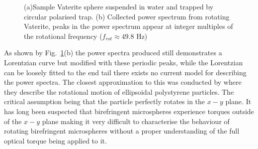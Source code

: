 \begin{figure}[h!]
\begin{subfigure}{0.55\linewidth}
		\subcaption{}
	\end{subfigure}
	\caption{(a)Sample Vaterite sphere suspended in water and trapped by circular polarised trap. (b) Collected power spectrum from rotating Vaterite, peaks in the power spectrum appear at integer multiples of the rotational frequency ($f_{rot} \approx 49.8$ Hz)}
	\label{fig:vaterite}
\end{figure}

As shown by Fig.~\ref{fig:vaterite}(b) the power spectra produced still 
demonstrates a Lorentzian curve but modified with these periodic peaks, 
while the Lorentzian can be loosely fitted to the end tail there exists 
no current model for describing the power spectra. The closest approximation
to this was conducted by \cite{Yogesha2012} where they describe the 
rotational motion of ellipsoidal polystyrene particles. The critical 
assumption being that the particle perfectly rotates in the $x-y$ plane. 
It has long been suspected that birefringent microspheres experience torques 
outside of the $x-y$ plane \cite{Volpe2023} making it very difficult to 
characterise the behaviour of rotating birefringent microspheres without a 
proper understanding of the full optical torque being applied to it.

